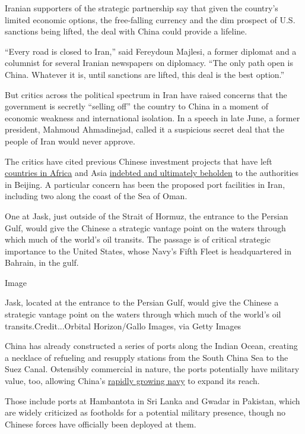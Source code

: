 Iranian supporters of the strategic partnership say that given the
country's limited economic options, the free-falling currency and the
dim prospect of U.S. sanctions being lifted, the deal with China could
provide a lifeline.

``Every road is closed to Iran,'' said Fereydoun Majlesi, a former
diplomat and a columnist for several Iranian newspapers on diplomacy.
``The only path open is China. Whatever it is, until sanctions are
lifted, this deal is the best option.''

But critics across the political spectrum in Iran have raised concerns
that the government is secretly ``selling off'' the country to China in
a moment of economic weakness and international isolation. In a speech
in late June, a former president, Mahmoud Ahmadinejad, called it a
suspicious secret deal that the people of Iran would never approve.

The critics have cited previous Chinese investment projects that have
left
\href{https://www.nytimes.com/2018/10/15/world/africa/kenya-china-racism.html}{countries
in Africa} and Asia
\href{https://www.nytimes.com/2018/06/25/world/asia/china-sri-lanka-port.html}{indebted
and ultimately beholden} to the authorities in Beijing. A particular
concern has been the proposed port facilities in Iran, including two
along the coast of the Sea of Oman.

One at Jask, just outside of the Strait of Hormuz, the entrance to the
Persian Gulf, would give the Chinese a strategic vantage point on the
waters through which much of the world's oil transits. The passage is of
critical strategic importance to the United States, whose Navy's Fifth
Fleet is headquartered in Bahrain, in the gulf.

Image

Jask, located at the entrance to the Persian Gulf, would give the
Chinese a strategic vantage point on the waters through which much of
the world's oil transits.Credit...Orbital Horizon/Gallo Images, via
Getty Images

China has already constructed a series of ports along the Indian Ocean,
creating a necklace of refueling and resupply stations from the South
China Sea to the Suez Canal. Ostensibly commercial in nature, the ports
potentially have military value, too, allowing China's
\href{https://www.nytimes.com/2018/08/29/world/asia/china-navy-aircraft-carrier-pacific.html}{rapidly
growing navy} to expand its reach.

Those include ports at Hambantota in Sri Lanka and Gwadar in Pakistan,
which are widely criticized as footholds for a potential military
presence, though no Chinese forces have officially been deployed at
them.

